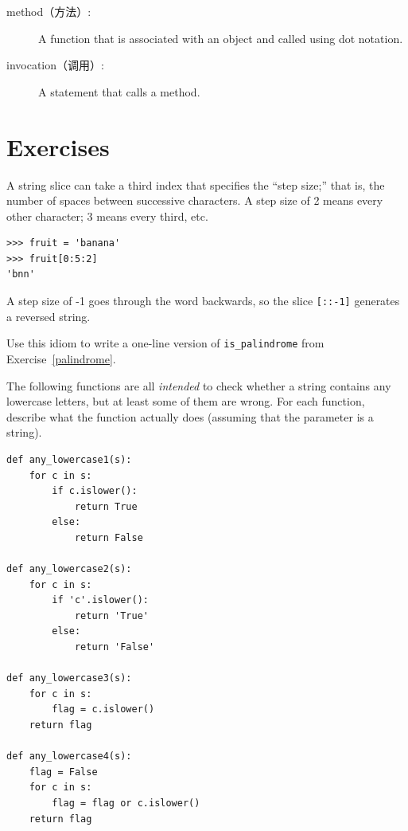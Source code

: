 \documentclass[10pt]{book}
\begin{document}
\begin{CJK}{UTF8}{gbsn}
\begin{description}
\item[method（方法）:] A function that is associated with an object and called
using dot notation.

\item[invocation（调用）:] A statement that calls a method.

\end{description}


\section{Exercises}

\begin{exercise}

A string slice can take a third index that specifies the ``step
size;'' that is, the number of spaces between successive characters.
A step size of 2 means every other character; 3 means every third,
etc.

\begin{verbatim}
>>> fruit = 'banana'
>>> fruit[0:5:2]
'bnn'
\end{verbatim}

A step size of -1 goes through the word backwards, so
the slice \verb"[::-1]" generates a reversed string.

Use this idiom to write a one-line version of \verb"is_palindrome"
from Exercise~\ref{palindrome}.
\end{exercise}


\begin{exercise}

The following functions are all {\em intended} to check whether a
string contains any lowercase letters, but at least some of them are
wrong.  For each function, describe what the function actually does
(assuming that the parameter is a string).

\begin{verbatim}
def any_lowercase1(s):
    for c in s:
        if c.islower():
            return True
        else:
            return False

def any_lowercase2(s):
    for c in s:
        if 'c'.islower():
            return 'True'
        else:
            return 'False'

def any_lowercase3(s):
    for c in s:
        flag = c.islower()
    return flag

def any_lowercase4(s):
    flag = False
    for c in s:
        flag = flag or c.islower()
    return flag


\end{verbatim}
\end{exercise}
\end{CJK}
\end{document}
